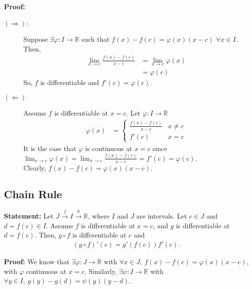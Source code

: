 \documentclass[10pt]{extarticle}
\newcommand{\R}{\mathbb{R}}
\begin{document}
    \textbf{Proof:} 
    \begin{description}
      \item[$(\Rightarrow)$:] Suppose $\exists \varphi: I\rightarrow \R$ such that $f(x) - f(c) = \varphi(x)(x-c)$ $\forall x\in I$. Then,
        \begin{align*}
          \lim_{x\rightarrow c}\frac{f(x) - f(c)}{x-c} &= \lim_{x\rightarrow c} \varphi(x)\\
                                                       &= \varphi(c)
        \end{align*}
        So, $f$ is differentiable and $f'(c) = \varphi(c)$.
      \item[$(\Leftarrow)$] Assume $f$ is differentiable at $x=c$. Let $\varphi: I\rightarrow \R$
        \begin{align*}
          \varphi(x) &= \begin{cases}
            \frac{f(x) - f(c)}{x-c} & x\neq c\\
            f'(c) & x = c
          \end{cases}
        \end{align*}
        It is the case that $\varphi$ is continuous at $x=c$ since $\lim_{x\rightarrow c}\varphi(x) = \lim_{x\rightarrow c}\frac{f(x) - f(c)}{x-c} = f'(c) = \varphi(c)$.\\

        Clearly, $f(x) - f(c) = \varphi(x) (x-c)$.
    \end{description}
  \subsection{Chain Rule}%
    \textbf{Statement:} Let $J\xrightarrow{f} I \xrightarrow{g} \R$, where $I$ and $J$ are intervals. Let $c\in J$ and $d = f(c)\in I$. Assume $f$ is differentiable at $x=c$, and $g$ is differentiable at $d = f(c)$. Then, $g\circ f$ is differentiable at $c$ and
    \begin{align*}
      (g\circ f)'(c) = g'(f(c))f'(c).
    \end{align*}

    \textbf{Proof:} We know that $\exists \varphi: J\rightarrow \R$ with $\forall x\in J,~f(x)-f(c) = \varphi(x)(x-c)$, with $\varphi$ continuous at $x=c$. Similarly, $\exists \psi: I\rightarrow \R$ with $\forall y\in I,~g(y)-g(d) = \psi(y)(y-d)$.\\
\end{document}

